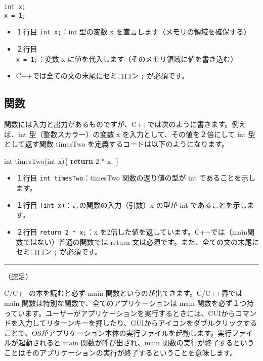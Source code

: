 \documentclass[]{book}
\newenvironment{Shaded}{\begin{snugshade}}{\end{snugshade}}
\newcommand{\KeywordTok}[1]{\textcolor[rgb]{0.13,0.29,0.53}{\textbf{{#1}}}}
\newcommand{\DataTypeTok}[1]{\textcolor[rgb]{0.13,0.29,0.53}{{#1}}}
\newcommand{\DecValTok}[1]{\textcolor[rgb]{0.00,0.00,0.81}{{#1}}}
\newcommand{\NormalTok}[1]{{#1}}
\providecommand{\tightlist}{%
  \setlength{\itemsep}{0pt}\setlength{\parskip}{0pt}}
\begin{document}
\begin{verbatim}
int x;
x = 1; 
\end{verbatim}

\begin{itemize}
\tightlist
\item
  １行目 \texttt{int\ x;}：int 型の変数 x
  を宣言します（メモリの領域を確保する）
\item
  ２行目 \texttt{x\ =\ 1;}：変数 x
  に値を代入します（そのメモリ領域に値を書き込む）
\item
  C++では全ての文の末尾にセミコロン \texttt{;} が必須です。
\end{itemize}

\subsection{関数}

関数には入力と出力があるものですが、C++では次のように書きます。例えば、int
型（整数スカラー）の変数 x を入力として、その値を２倍にして int
型として返す関数 timesTwo を定義するコードは以下のようになります。

\begin{Shaded}
\begin{Highlighting}[]
\DataTypeTok{int} \NormalTok{timesTwo(}\DataTypeTok{int} \NormalTok{x)\{}
  \KeywordTok{return} \DecValTok{2} \NormalTok{* x;}
\NormalTok{\}}
\end{Highlighting}
\end{Shaded}

\begin{itemize}
\tightlist
\item
  １行目 \texttt{int\ timesTwo}：timesTwo 関数の返り値の型が int
  であることを示します。
\item
  １行目 \texttt{(int\ x)}：この関数の入力（引数）x の型が int
  であることを示します。
\item
  ２行目 \texttt{return\ 2\ *\ x;}：x
  を2倍した値を返しています。C++では（main関数ではない）普通の関数では
  return 文は必須です。また、全ての文の末尾にセミコロン \texttt{;}
  が必須です。
\end{itemize}

\begin{center}\rule{0.5\linewidth}{\linethickness}\end{center}

（蛇足）

C/C++の本を読むと必ず main 関数というのが出てきます。C/C++界では main
関数は特別な関数で、全てのアプリケーションは main
関数を必ず１つ持っています。ユーザーがアプリケーションを実行するときには、CUIからコマンドを入力してリターンキーを押したり、GUIからアイコンをダブルクリックすることで、OSがアプリケーション本体の実行ファイルを起動します。実行ファイルが起動されると
main 関数が呼び出され、main
関数の実行が終了するということはそのアプリケーションの実行が終了するということを意味します。
\end{document}

